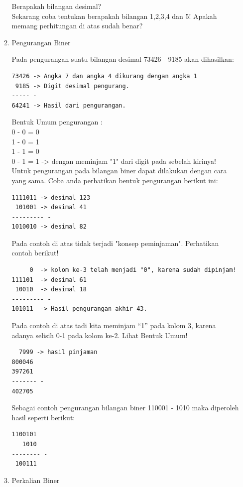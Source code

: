 \begin{enumerate}[label=(\alph*)]
\begin{enumerate}
Berapakah bilangan desimal? \\

Sekarang coba tentukan berapakah bilangan 1,2,3,4 dan 5! Apakah memang perhitungan di atas sudah benar? \\

\item Pengurangan Biner

\qquad Pada pengurangan suatu bilangan desimal 73426 - 9185 akan dihasilkan:
\begin{verbatim}
73426 -> Angka 7 dan angka 4 dikurang dengan angka 1
 9185 -> Digit desimal pengurang.
----- -
64241 -> Hasil dari pengurangan.
\end{verbatim}

Bentuk Umum pengurangan : \\
0 - 0 = 0 \\
1 - 0 = 1 \\
1 - 1 = 0 \\
0 - 1 = 1 -> dengan meminjam "1" dari digit pada sebelah kirinya! \\
 
\quad Untuk pengurangan pada bilangan biner dapat dilakukan dengan cara yang sama. Coba anda perhatikan bentuk pengurangan berikut ini:
\begin{verbatim}
1111011 -> desimal 123
 101001 -> desimal 41
--------- -
1010010 -> desimal 82 
\end{verbatim}
\qquad Pada contoh di atas tidak terjadi "konsep peminjaman". Perhatikan contoh berikut!

\begin{verbatim}
     0  -> kolom ke-3 telah menjadi "0", karena sudah dipinjam!
111101  -> desimal 61
 10010  -> desimal 18
--------- -
101011  -> Hasil pengurangan akhir 43.
\end{verbatim}

\qquad Pada contoh di atas tadi kita meminjam “1” pada kolom 3, karena adanya selisih 0-1 pada kolom ke-2. Lihat Bentuk Umum!
\begin{verbatim}
  7999 -> hasil pinjaman
800046
397261
------- -
402705
\end{verbatim}

\qquad Sebagai contoh pengurangan bilangan biner 110001 - 1010 maka diperoleh hasil seperti berikut:
\begin{verbatim}
1100101
   1010
-------- - 
 100111
\end{verbatim}

\item Perkalian Biner


\end{enumerate}
\end{enumerate}
